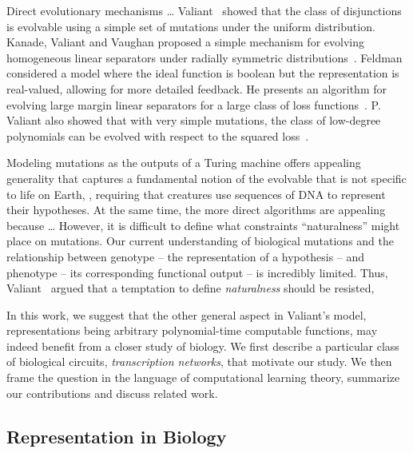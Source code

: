 Direct evolutionary mechanisms \dots {}
Valiant~\cite{Valiant:2009-evolvability} showed that the class of
disjunctions is evolvable using a simple set of mutations under the uniform
distribution. Kanade, Valiant and Vaughan proposed a simple mechanism for
evolving homogeneous linear separators under radially symmetric
distributions~\cite{KVV:2010-drift}.  Feldman considered a model where the
ideal function is boolean but the representation is real-valued, allowing for
more detailed feedback. He presents an algorithm for evolving large margin
linear separators for a large class of loss functions~\cite{Feldman:2011-LTF}.
P.  Valiant also showed that with very simple mutations, the class of low-degree
polynomials can be evolved with respect to the squared loss~\cite{Valiant:2012-real}.

Modeling mutations as the outputs of a Turing machine offers appealing
generality that captures a fundamental notion of the evolvable that is not
specific to life on Earth, \eg, requiring that creatures use sequences of DNA
to represent their hypotheses.
At the same time, the more direct algorithms are appealing because \dots
{}
However, it is difficult to define what constraints ``naturalness'' might place
on mutations.  Our current understanding of biological mutations and the
relationship between genotype -- the representation of a hypothesis --
and phenotype -- its corresponding functional output -- is incredibly limited.
Thus, Valiant~\cite{Valiant:2013-PAC} argued that a temptation to define
\emph{naturalness} should be resisted, 

In this work, we suggest that the other general aspect in Valiant's model, 
 representations being arbitrary
polynomial-time computable functions, may indeed benefit from a closer study of
biology. We first describe a particular class of biological circuits,
\emph{transcription networks}, that motivate our study. We then frame the
question in the language of computational learning theory, summarize our
contributions and discuss related work.

\subsection{Representation in Biology}

